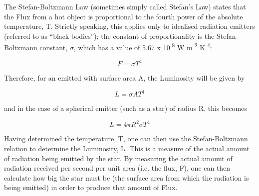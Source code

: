 \documentclass[revision-guide.tex]{subfiles}
\begin{document}
The Stefan-Boltzmann Law (sometimes simply called Stefan's Law) states
that the Flux from a hot object is proportional to the fourth power of
the absolute temperature, T. Strictly speaking, this applies only to
idealised radiation emitters (referred to as ``black bodies''); the
constant of proportionality is the Stefan-Boltzmann constant, $\sigma$, which
has a value of 5.67 x 10\textsuperscript{-8} W m\textsuperscript{-2}
K\textsuperscript{-4}:

\[F = \sigma T^{4}\]

Therefore, for an emitted with surface area A, the Luminosity will be
given by

\[L =\sigma A T^{4}\]

and in the case of a spherical emitter (such as a star) of radius R,
this becomes

\[L = 4 \pi R^{2} \sigma T^{4}\]




Having determined the temperature, T, one can then use the
Stefan-Boltzmann relation to determine the Luminosity, L. This is a
measure of the actual amount of radiation being emitted by the star. By
measuring the actual amount of radiation received per second per unit
area (i.e. the flux, F), one can then calculate how big the star must be
(the surface area from which the radiation is being emitted) in order to
produce that amount of Flux.
\end{document}
